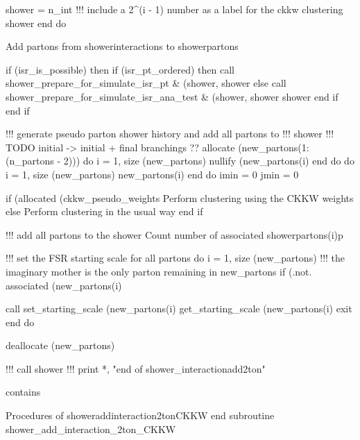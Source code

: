        shower%
            = n_int
       !!! include a 2^(i - 1) number as a label for the ckkw clustering
       shower%
    end do

    \LA{}Add partons from \code{}shower{}interactions\edoc{} to \code{}shower{}partons\edoc{}\RA{}

    if (isr_is_possible) then
       if (isr_pt_ordered) then
          call shower_prepare_for_simulate_isr_pt &
               (shower, shower%
       else
          call shower_prepare_for_simulate_isr_ana_test &
               (shower, shower%
               shower%
       end if
    end if

    !!! generate pseudo parton shower history and add all partons to
    !!!          shower%
    !!! TODO initial -> initial + final branchings ??
    allocate (new_partons(1:(n_partons - 2)))
    do i = 1, size (new_partons)
       nullify (new_partons(i)%
    end do
    do i = 1, size (new_partons)
       new_partons(i)%
    end do
    imin = 0
    jmin = 0

    if (allocated (ckkw_pseudo_weights%
       \LA{}Perform clustering using the CKKW weights\RA{}
    else
       \LA{}Perform clustering in the usual way\RA{}
    end if

    !!! add all partons to the shower
    \LA{}Count number of associated \code{}shower{}partons(i){}p\edoc{}\RA{}

    !!! set the FSR starting scale for all partons
    do i = 1, size (new_partons)
       !!! the imaginary mother is the only parton remaining in new_partons
       if (.not. associated (new_partons(i)%

       call set_starting_scale (new_partons(i)%
            get_starting_scale (new_partons(i)%
       exit
    end do

    deallocate (new_partons)

    !!! call shower%
    !!! print *, "end of shower_interactionadd2ton"

  contains

    \LA{}Procedures of \code{}shower{}add{}interaction{}2ton{}CKKW\edoc{}\RA{}
  end subroutine shower_add_interaction_2ton_CKKW

